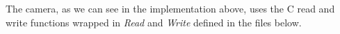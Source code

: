 \ \\

\ \\
\ \\

\ \\
The camera, as we can see in the implementation above, uses the C read and write functions wrapped in \textit{Read} and \textit{Write} defined in the files below.
\ \\

\ \\
\ \\

\ \\